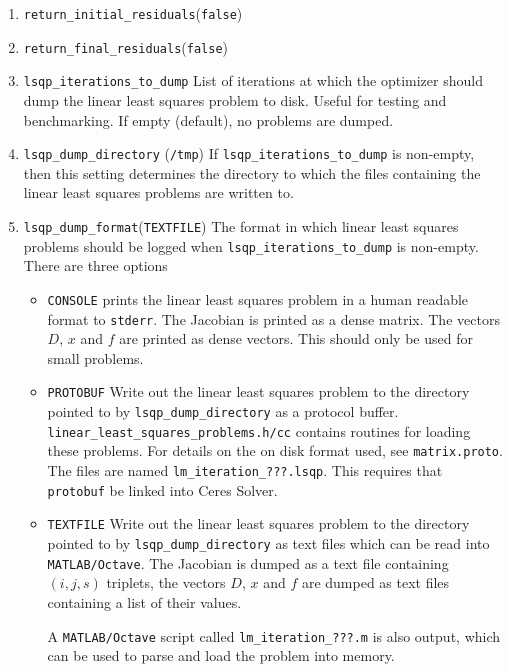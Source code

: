 \begin{enumerate}
\item{\texttt{return\_initial\_residuals}}(\texttt{false})
\item{\texttt{return\_final\_residuals}}(\texttt{false})


\item{\texttt{lsqp\_iterations\_to\_dump}}
 List of iterations at which the optimizer should dump the
     linear least squares problem to disk. Useful for testing and
     benchmarking. If empty (default), no problems are dumped.

\item{\texttt{lsqp\_dump\_directory}} (\texttt{/tmp})
 If \texttt{lsqp\_iterations\_to\_dump} is non-empty, then this setting determines the directory to which the files containing the linear least squares problems are written to.


\item{\texttt{lsqp\_dump\_format}}(\texttt{TEXTFILE}) The format in which linear least squares problems should be logged
when \texttt{lsqp\_iterations\_to\_dump} is non-empty.  There are three options
\begin{itemize}
\item{\texttt{CONSOLE}} prints the linear least squares problem in a human readable format
  to \texttt{stderr}. The Jacobian is printed as a dense matrix. The vectors
   $D$, $x$ and $f$ are printed as dense vectors. This should only be used
   for small problems.
\item{\texttt{PROTOBUF}}  
   Write out the linear least squares problem to the directory
   pointed to by \texttt{lsqp\_dump\_directory} as a protocol
   buffer. \texttt{linear\_least\_squares\_problems.h/cc} contains routines for
   loading these problems. For details on the on disk format used,
   see \texttt{matrix.proto}. The files are named \texttt{lm\_iteration\_???.lsqp}. This requires that \texttt{protobuf} be linked into Ceres Solver.
\item{\texttt{TEXTFILE}}
   Write out the linear least squares problem to the directory
   pointed to by \texttt{lsqp\_dump\_directory} as text files
   which can be read into \texttt{MATLAB/Octave}. The Jacobian is dumped as a
   text file containing $(i,j,s)$ triplets, the vectors $D$, $x$ and $f$ are
   dumped as text files containing a list of their values.
  
   A \texttt{MATLAB/Octave} script called \texttt{lm\_iteration\_???.m} is also output,
   which can be used to parse and load the problem into memory.
\end{itemize}




\end{enumerate}

